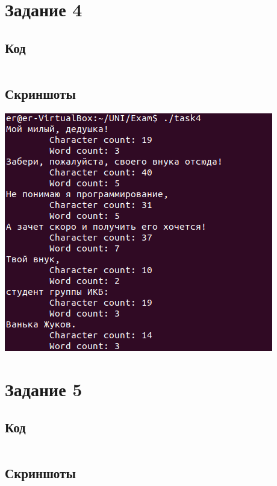 \documentclass{article}
\begin{document}
\pagebreak

\section{Задание 4}

    \subsection{Код}

        \inputminted[frame=single, fontsize=\small]{cpp}{task4/task4.cpp}

    \subsection{Скриншоты}

        \includegraphics[scale=0.5]{task4/task4.png}

\pagebreak

\section{Задание 5}

    \subsection{Код}

        \inputminted[frame=single, fontsize=\small]{cpp}{task5/task5.cpp}

    \subsection{Скриншоты}
\end{document}
